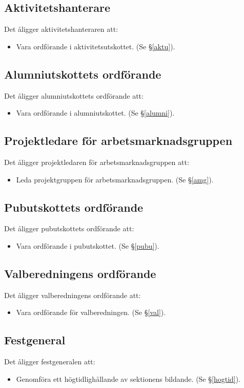 \documentclass{datateknologsektionen-document}
\begin{document}
\subsection{Aktivitetshanterare}
Det åligger aktivitetshanteraren att:
\begin{itemize}
  \item Vara ordförande i aktivitetsutskottet. (Se \S \ref{aktu}).
\end{itemize}

\subsection{Alumniutskottets ordförande}
Det åligger alumniutskottets ordförande att:
\begin{itemize}
  \item Vara ordförande i alumniutskottet. (Se \S \ref{alumni}).
\end{itemize}
\subsection{Projektledare för arbetsmarknadsgruppen}
Det åligger projektledaren för arbetsmarknadsgruppen att:
\begin{itemize}
  \item Leda projektgruppen för arbetsmarknadsgruppen. (Se \S \ref{amg}).
\end{itemize}
\subsection{Pubutskottets ordförande}
Det åligger pubutskottets ordförande att:
\begin{itemize}
  \item Vara ordförande i pubutskottet. (Se \S \ref{pubu}).
\end{itemize}

\subsection{Valberedningens ordförande}
\label{valordforande}
Det åligger valberedningens ordförande att:
\begin{itemize}
  \item Vara ordförande för valberedningen. (Se \S \ref{val}).
\end{itemize}

\subsection{Festgeneral}
Det åligger festgeneralen att:
\begin{itemize}
  \item Genomföra ett högtidlighållande av sektionens bildande. (Se \S \ref{hogtid}).
\end{itemize}
\end{document}
